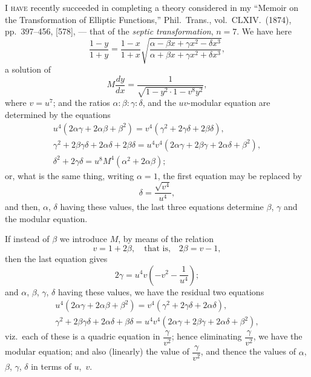 \documentclass[11pt,a4paper]{book}
\begin{document}

\bigskip

\textsc{I have} recently succeeded in completing a theory considered in my ``Memoir on the Transformation of Elliptic Functions,'' Phil.\ Trans., vol.\ CLXIV.\ (1874), pp.\ 397--456, [578], --- that of the \textit{septic transformation}, $n = 7$. We have here
\[
\frac{1 - y}{1 + y} = \frac{1 - x}{1 + x}\sqrt{\frac{\alpha - \beta x + \gamma x^2 - \delta x^3}{\alpha + \beta x + \gamma x^2 + \delta x^3}},
\]
a solution of
\[
M\frac{dy}{dx} = \frac{1}{\sqrt{1 - y^2 \cdot 1 - v^8 y^2}},
\]
where $v = u^7$; and the ratios $\alpha : \beta : \gamma : \delta$, and the $uv$-modular equation are determined by the equations
\begin{gather*}
u^4(2\alpha\gamma + 2\alpha\beta + \beta^2) = v^4(\gamma^2 + 2\gamma\delta + 2\beta\delta),\\
\gamma^2 + 2\beta\gamma\delta + 2\alpha\delta + 2\beta\delta = u^4 v^4 (2\alpha\gamma + 2\beta\gamma + 2\alpha\delta + \beta^2),\\
\delta^2 + 2\gamma\delta = u^8 M^4 (\alpha^2 + 2\alpha\beta);
\end{gather*}
or, what is the same thing, writing $\alpha = 1$, the first equation may be replaced by
\[
\delta = \frac{\sqrt{v^4}}{u^4},
\]
and then, $\alpha$, $\delta$ having these values, the last three equations determine $\beta$, $\gamma$ and the modular equation.

If instead of $\beta$ we introduce $M$, by means of the relation
\[
v = 1 + 2\beta,\quad\text{that is,}\quad 2\beta = v - 1,
\]
then the last equation gives
\[
2\gamma = u^4 v \left(-v^2 - \frac{1}{u^4}\right);
\]
and $\alpha$, $\beta$, $\gamma$, $\delta$ having these values, we have the residual two equations
\begin{gather*}
u^4(2\alpha\gamma + 2\alpha\beta + \beta^2) = v^4(\gamma^2 + 2\gamma\delta + 2\alpha\delta),\\
\gamma^2 + 2\beta\gamma\delta + 2\alpha\delta + \beta\delta = u^4 v^4(2\alpha\gamma + 2\beta\gamma + 2\alpha\delta + \beta^2),
\end{gather*}
viz.\ each of these is a quadric equation in $\dfrac{\gamma}{v^2}$; hence eliminating $\dfrac{\gamma}{v^2}$, we have the modular equation; and also (linearly) the value of $\dfrac{\gamma}{v^2}$, and thence the values of $\alpha$, $\beta$, $\gamma$, $\delta$ in terms of $u$,~$v$.
\end{document}
